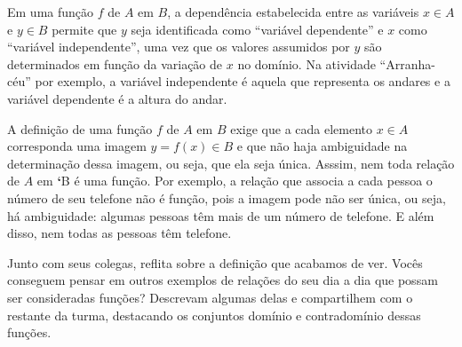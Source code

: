 Em uma função \(f\) de \(A\) em \(B\), a dependência estabelecida entre as variáveis \(x \in A\) e \(y \in B\) permite que \(y\) seja identificada como “variável dependente” e \(x\) como  “variável independente”, uma vez que os valores assumidos por \(y\) são determinados em função da variação de \(x\) no domínio. Na atividade “Arranha-céu” por exemplo, a variável independente é aquela que representa os andares e a variável dependente é a altura do andar.

\begin{observation}{}

A definição de uma função \(f\) de \(A\) em \(B\) exige que a cada elemento \(x\in A\) corresponda uma imagem \(y=f(x)\in B\) e que não haja ambiguidade na determinação dessa imagem, ou seja, que ela seja única. Asssim, nem toda relação de \(A\) em {\color{red}\bfseries{}{}`}B é uma função. Por exemplo, a relação que associa a cada pessoa o número de seu telefone não é função, pois a imagem pode não ser única, ou seja, há ambiguidade: algumas pessoas têm mais de um número de telefone. E além disso, nem todas as pessoas têm telefone.
\end{observation}

\begin{reflection}{}

Junto com seus colegas, reflita sobre a definição que acabamos de ver. Vocês conseguem pensar em outros exemplos de relações do seu dia a dia que possam ser consideradas funções? Descrevam algumas delas e compartilhem com o restante da turma, destacando os conjuntos domínio e contradomínio dessas funções.
\end{reflection}
\newpage
\practice{}

\label{\detokenize{AF106-2:sec-funcao-organizando-ideias}}\label{\detokenize{AF106-2::doc}}\label{\detokenize{AF106-2:praticando}}


